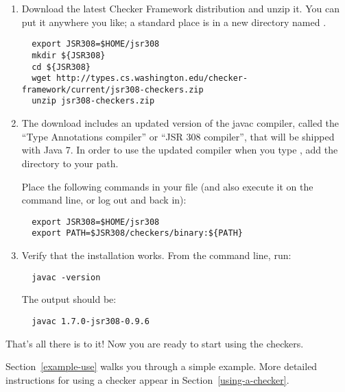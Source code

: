 \begin{enumerate}

\item
  Download the latest Checker Framework distribution
  and unzip it.  You can put it anywhere you like; a standard place is in a
  new directory named .

\begin{Verbatim}
  export JSR308=$HOME/jsr308
  mkdir ${JSR308}
  cd ${JSR308}
  wget http://types.cs.washington.edu/checker-framework/current/jsr308-checkers.zip
  unzip jsr308-checkers.zip
\end{Verbatim}

\item
  The download includes an updated version of the javac compiler, called
  the ``Type Annotations compiler'' or ``JSR 308 compiler'', that will be
  shipped with Java 7.  In order to use the updated compiler when you type
  , add the directory  to your path.

  Place the following commands in your  file (and also execute
  it on the command line, or log out and back in):
\begin{Verbatim}
  export JSR308=$HOME/jsr308
  export PATH=$JSR308/checkers/binary:${PATH}
\end{Verbatim}



\item
  Verify that the installation works.  From the command line, run:

\begin{Verbatim}
  javac -version
\end{Verbatim}

The output should be:

\begin{Verbatim}
  javac 1.7.0-jsr308-0.9.6
\end{Verbatim}

\end{enumerate}

That's all there is to it!  Now you are ready to start using the checkers.

Section~\ref{example-use} walks you through a simple example.  More detailed
instructions for using a checker appear in Section~\ref{using-a-checker}.


